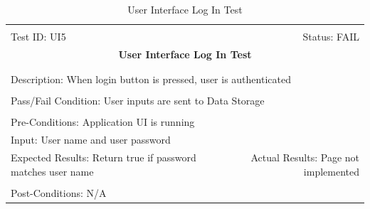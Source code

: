\documentclass[11pt]{article}
\begin{document}
\begin{center}
\begin{table}[H]
\begin{tabular}{|l r|}\hline&\\[-2mm]
	Test ID: UI5	&Status: FAIL \\[-3mm]
	\multicolumn{2}{|c|}{\textbf{\large{User Interface Log In Test}}}\\&\\\hline&\\[-3mm]
	\multicolumn{2}{|p{\textwidth}|}{Description: When login button is pressed, user is authenticated}\\[1mm]\hline&\\[-3mm]
	\multicolumn{2}{|p{\textwidth}|}{Pass/Fail Condition: User inputs are sent to Data Storage}\\[1mm]\hline&\\[-3mm]
	\multicolumn{2}{|p{\textwidth}|}{Pre-Conditions: Application UI is running}\\[4mm]
	\multicolumn{2}{|p{\textwidth}|}{Input: User name and user password}\\[2mm]\hline
	\multicolumn{1}{|p{0.49\textwidth}}{Expected Results: Return true if password matches user name}	&\multicolumn{1}{|p{0.45\textwidth}|}{Actual Results: Page not implemented}\\\hline&\\[-3mm]
	\multicolumn{2}{|p{\textwidth}|}{Post-Conditions: N/A}\\\hline
\end{tabular}
\caption{User Interface Log In Test}
\end{table}
\end{center}
\end{document}

